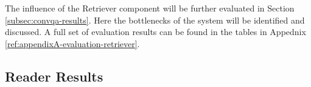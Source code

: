


The influence of the Retriever component will be further evaluated in Section \ref{subsec:convqa-results}. Here the bottlenecks of the system will be identified and discussed. A full set of evaluation results can be found in the tables in Appednix \ref{ref:appendixA-evaluation-retriever}.


\subsection{Reader Results}
\label{subsec:reader-results}


